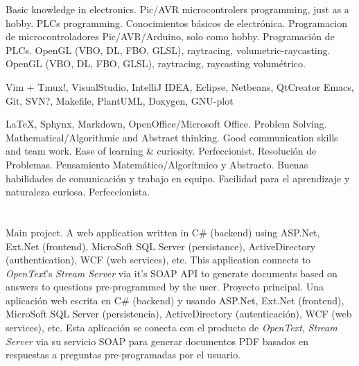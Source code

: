 \documentclass[11pt,a4paper,sans]{moderncv}
\begin{document}

\cvcomputer
    {}
        {\ml
        {Basic knowledge in electronics. Pic/AVR microcontrolers programming,
        just as a hobby. PLCs programming.}
        {Conocimientos básicos de electrónica. Programacion de
        microcontroladores Pic/AVR/Arduino, solo como hobby. Programación de
        PLCs.}}
    {}
        {\ml
        {OpenGL (VBO, DL, FBO, GLSL), raytracing, volumetric-raycasting.}
        {OpenGL (VBO, DL, FBO, GLSL), raytracing, raycasting volumétrico.}}


\cvcomputer
    {}
        {Vim + Tmux!, VisualStudio, IntelliJ IDEA, Eclipse, Netbeans,
        QtCreator}
    {}
        {Emacs, Git, SVN?, Makefile, PlantUML, Doxygen, GNU-plot}

\cvcomputer
    {}
        {\LaTeX, Sphynx, Markdown,  OpenOffice/Microsoft Office.}
    {}
        {\ml
        {Problem Solving. Mathematical/Algorithmic and Abstract thinking. Good
        communication skills and team work. Ease of learning \& curiosity.
        Perfeccionist.}
        {Resolución de Problemas. Pensamiento Matemático/Algorítmico y
        Abstracto. Buenas habilidades de comunicación y trabajo en equipo.
        Facilidad para el aprendizaje y naturaleza curiosa.  Perfeccionista.}}


\section{}


    {\ml
    {Main project. A web application written in C\# (backend) using ASP.Net,
    Ext.Net (frontend), MicroSoft SQL Server (persistance), ActiveDirectory
    (authentication), WCF (web services), etc. This application connects to
    \textit{OpenText}'s \textit{Stream Server} via it's SOAP API to generate
    documents based on answers to questions pre-programmed by the user.}
    {Proyecto principal. Una aplicación web escrita en C\# (backend) y usando
    ASP.Net, Ext.Net (frontend), MicroSoft SQL Server (persistencia),
    ActiveDirectory (autenticación), WCF (web services), etc. Esta aplicación
    se conecta con el producto de \textit{OpenText}, \textit{Stream Server} via
    su servicio SOAP para generar documentos PDF basados en respuestas a
    preguntas pre-programadas por el usuario.}
}
\end{document}
